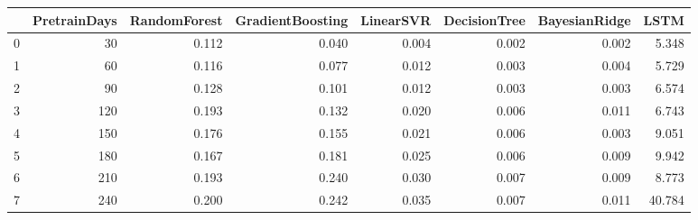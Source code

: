 \begin{tabular}{lrrrrrrr}
\toprule
{} &  PretrainDays &  RandomForest &  GradientBoosting &  LinearSVR &  DecisionTree &  BayesianRidge &   LSTM \\
\midrule
0 &            30 &         0.112 &             0.040 &      0.004 &         0.002 &          0.002 &  5.348 \\
1 &            60 &         0.116 &             0.077 &      0.012 &         0.003 &          0.004 &  5.729 \\
2 &            90 &         0.128 &             0.101 &      0.012 &         0.003 &          0.003 &  6.574 \\
3 &           120 &         0.193 &             0.132 &      0.020 &         0.006 &          0.011 &  6.743 \\
4 &           150 &         0.176 &             0.155 &      0.021 &         0.006 &          0.003 &  9.051 \\
5 &           180 &         0.167 &             0.181 &      0.025 &         0.006 &          0.009 &  9.942 \\
6 &           210 &         0.193 &             0.240 &      0.030 &         0.007 &          0.009 &  8.773 \\
7 &           240 &         0.200 &             0.242 &      0.035 &         0.007 &          0.011 & 40.784 \\
\bottomrule
\end{tabular}
